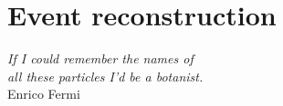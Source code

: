 \chapter{Event reconstruction}
\label{chp:obj}

\begin{flushright}
\begin{small}
\emph{If I could remember the names of\\
all these particles I'd be a botanist.\\}
Enrico Fermi
\end{small}
\end{flushright}

\minitoc







